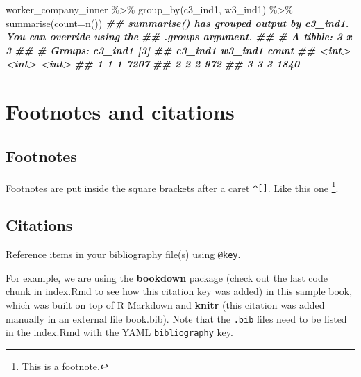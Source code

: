 \documentclass[
]{book}
\newenvironment{Shaded}{\begin{snugshade}}{\end{snugshade}}
\newcommand{\AttributeTok}[1]{\textcolor[rgb]{0.77,0.63,0.00}{#1}}
\newcommand{\DocumentationTok}[1]{\textcolor[rgb]{0.56,0.35,0.01}{\textbf{\textit{#1}}}}
\newcommand{\FunctionTok}[1]{\textcolor[rgb]{0.00,0.00,0.00}{#1}}
\newcommand{\NormalTok}[1]{#1}
\newcommand{\SpecialCharTok}[1]{\textcolor[rgb]{0.00,0.00,0.00}{#1}}
\theoremstyle{definition}
\theoremstyle{definition}
\theoremstyle{definition}
\theoremstyle{definition}
\theoremstyle{remark}
\begin{document}
\begin{Shaded}
\begin{Highlighting}[]
\NormalTok{worker\_company\_inner }\SpecialCharTok{\%\textgreater{}\%} 
  \FunctionTok{group\_by}\NormalTok{(c3\_ind1, w3\_ind1) }\SpecialCharTok{\%\textgreater{}\%} 
  \FunctionTok{summarise}\NormalTok{(}\AttributeTok{count=}\FunctionTok{n}\NormalTok{())}
\DocumentationTok{\#\# \textasciigrave{}summarise()\textasciigrave{} has grouped output by \textquotesingle{}c3\_ind1\textquotesingle{}. You can override using the}
\DocumentationTok{\#\# \textasciigrave{}.groups\textasciigrave{} argument.}
\DocumentationTok{\#\# \# A tibble: 3 x 3}
\DocumentationTok{\#\# \# Groups:   c3\_ind1 [3]}
\DocumentationTok{\#\#   c3\_ind1 w3\_ind1 count}
\DocumentationTok{\#\#     \textless{}int\textgreater{}   \textless{}int\textgreater{} \textless{}int\textgreater{}}
\DocumentationTok{\#\# 1       1       1  7207}
\DocumentationTok{\#\# 2       2       2   972}
\DocumentationTok{\#\# 3       3       3  1840}
\end{Highlighting}
\end{Shaded}

\hypertarget{footnotes-and-citations}{%
\chapter{Footnotes and citations}\label{footnotes-and-citations}}

\hypertarget{footnotes}{%
\section{Footnotes}\label{footnotes}}

Footnotes are put inside the square brackets after a caret \texttt{\^{}{[}{]}}. Like this one \footnote{This is a footnote.}.

\hypertarget{citations}{%
\section{Citations}\label{citations}}

Reference items in your bibliography file(s) using \texttt{@key}.

For example, we are using the \textbf{bookdown} package \citep{R-bookdown} (check out the last code chunk in index.Rmd to see how this citation key was added) in this sample book, which was built on top of R Markdown and \textbf{knitr} \citep{xie2015} (this citation was added manually in an external file book.bib).
Note that the \texttt{.bib} files need to be listed in the index.Rmd with the YAML \texttt{bibliography} key.
\end{document}
